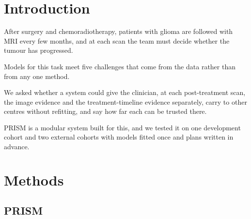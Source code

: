 \documentclass[largeformat]{interact} %
\begin{document}
\section{Introduction}\label{sec:1}

After surgery and chemoradiotherapy, patients with glioma are followed with MRI every few months, and at each scan
the team must decide whether the tumour has progressed.

Models for this task meet five challenges that come from the data rather than from any one method.

We asked whether a system could give the clinician, at each post-treatment scan, the image evidence and the
treatment-timeline evidence separately, carry to other centres without refitting, and say how far each can be trusted
there.

PRISM is a modular system built for this, and we tested it on one development cohort and two external cohorts with
models fitted once and plans written in advance.

\section{Methods}\label{sec:2}

\subsection{PRISM}\label{sec:2.1}
\end{document}
